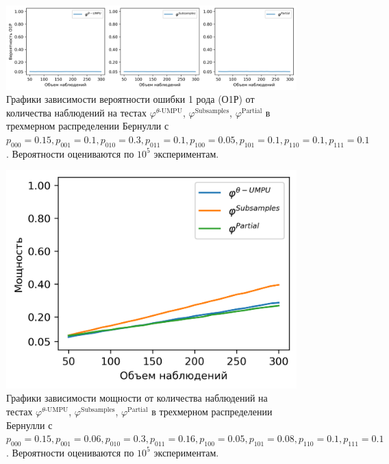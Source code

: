\begin{figure}[H]
    \centering
    \includegraphics[scale=0.65]{images/graph2.png}
    \caption{Графики зависимости вероятности ошибки 1 рода (О1Р) от количества наблюдений
    на тестах $\varphi^{\text{$\theta$-UMPU}}$, $\varphi^{\text{Subsamples}}$, $\varphi^{\text{Partial}}$
    в трехмерном распределении Бернулли с $p_{000}=0.15, p_{001}=0.1, p_{010}=0.3, p_{011}=0.1,
    p_{100}=0.05, p_{101}=0.1, p_{110}=0.1, p_{111}=0.1$. Вероятности оцениваются по $10^5$ экспериментам.} \label{fig:2}
\end{figure}

\begin{figure}[H]
    \centering
    \includegraphics[scale=0.8]{images/graph3.png}
    \caption{Графики зависимости мощности от количества наблюдений
    на тестах $\varphi^{\text{$\theta$-UMPU}}$, $\varphi^{\text{Subsamples}}$, $\varphi^{\text{Partial}}$
    в трехмерном распределении Бернулли с $p_{000}=0.15, p_{001}=0.06, 
    p_{010}=0.3, p_{011}=0.16,
    p_{100}=0.05, p_{101}=0.08, p_{110}=0.1, p_{111}=0.1$. Вероятности оцениваются по $10^5$ экспериментам.} \label{fig:3}
\end{figure}

